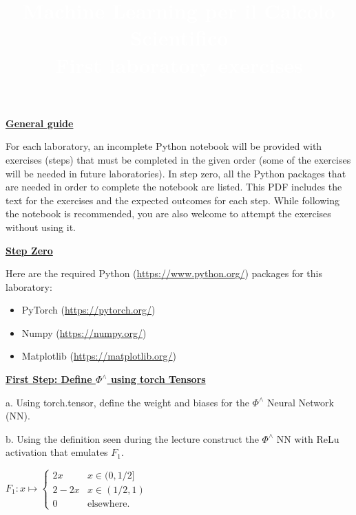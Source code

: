 \documentclass{article}
\title{\textcolor{white}{\textbf{Machine Learning per il Calcolo Scientifico}\\ \small\textbf{First laboratory exercises }}}
\date{}
\newcommand{\step}[1]{\underline{\textbf{\large{#1}}} }
\begin{document}
    
    \AddToShipoutPicture*
    {%
      \AtPageUpperLeft
        {%
          \color{bluunipv}%
          \raisebox{-.1\paperheight}{\rule{\paperwidth}{.5\paperheight}}%

        }%
    }
    \maketitle
    \begin{center}\step{General guide} \end{center}

    For each laboratory, an incomplete Python notebook will be provided with exercises (steps) that must be completed in the given order (some of the exercises will be needed in future laboratories). In step zero, all the Python packages that are needed in order to complete the notebook are listed. This PDF includes the text for the exercises and the expected outcomes for each step. While following the notebook is recommended, you are also welcome to attempt the exercises without using it.


    \begin{center}\step{Step Zero} \end{center}

    Here are the required Python (\url{https://www.python.org/}) packages for this laboratory:

    \begin{itemize}
      \item PyTorch (\url{https://pytorch.org/})
      \item Numpy (\url{https://numpy.org/})
      \item Matplotlib (\url{https://matplotlib.org/})
    \end{itemize}


    \begin{center}\step{First Step: Define $\Phi^\wedge$ using torch Tensors}\end{center}

    a. Using torch.tensor, define the weight and biases for the $\Phi^\wedge$ Neural Network (NN).
    
    b. Using the definition seen during the lecture construct the $\Phi^\wedge$ NN with ReLu activation that emulates $F_1$.
    \begin{center}
    $
      F_1 : x\mapsto 
      \begin{cases}
        2x &x\in (0, 1/2]\\
        2-2x &x \in (1/2, 1)\\
        0 &\text{elsewhere.}
      \end{cases}$
    \end{center}
\end{document}
